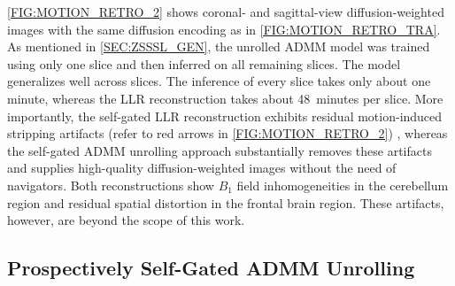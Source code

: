 \documentclass[AMA,STIX2COL,Linenumberson]{MRM}
\begin{document}
\cref{FIG:MOTION_RETRO_2} shows coronal- and sagittal-view
diffusion-weighted images
with the same diffusion encoding as in \cref{FIG:MOTION_RETRO_TRA}.
As mentioned in \cref{SEC:ZSSSL_GEN}, the unrolled ADMM model
was trained using only one slice
and then inferred on all remaining slices.
The model generalizes well across slices.
The inference of every slice takes only about one minute,
whereas the LLR reconstruction takes about 48~minutes per slice.
More importantly, the self-gated LLR reconstruction exhibits residual
motion-induced stripping artifacts
(refer to red arrows in \cref{FIG:MOTION_RETRO_2}) \cite{chang_2021_musium},
whereas the self-gated ADMM unrolling approach substantially removes these artifacts
and supplies high-quality diffusion-weighted images without the need of navigators.
Both reconstructions show $B_1$ field inhomogeneities in the cerebellum region
and residual spatial distortion in the frontal brain region.
These artifacts, however, are beyond the scope of this work.


\subsection{Prospectively Self-Gated ADMM Unrolling}
\end{document}
